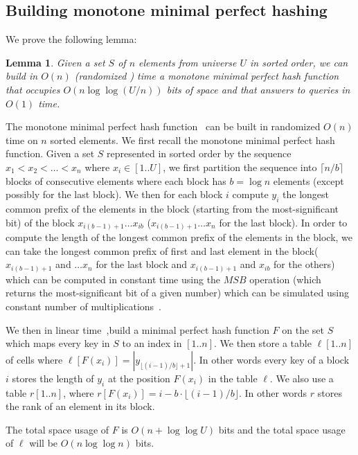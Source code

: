 \documentclass[a4paper]{article}
\newtheorem{lemma}{Lemma}
\begin{document}
\subsection{Building monotone minimal perfect hashing}
\label{sec:build_mmphf}
We prove the following lemma:


\begin{lemma}
\label{lemma:build_mmphf}
Given a set $S$ of $n$ elements from universe $U$ in sorted order, we can build in $O(n)$
(randomized ) time a monotone minimal perfect hash function that occupies $O(n\log\log(U/n))$
bits of space and that answers to queries in $O(1)$ time. 
\end{lemma}
The monotone minimal perfect hash function~\cite{BBPV09} can be built in randomized $O(n)$ time on $n$ sorted elements. 
We first recall the monotone minimal perfect hash function. Given a set $S$ represented in sorted 
order by the sequence $x_1<x_2<\ldots <x_n$
where $x_i\in [1..U]$, we first partition the sequence into $\lceil n/b\rceil$ blocks
of consecutive elements where each block has $b=\log n$ elements (except possibly for the last block). 
We then for each block $i$ compute $y_i$ the longest common prefix of the elements 
in the block (starting from the most-significant bit)
of the block $x_{i(b-1)+1}\ldots x_{ib}$ ($x_{i(b-1)+1}\ldots x_n$ for the last block). 
In order to compute the length of the longest common prefix of the elements in the block, 
we can take the longest common prefix of first and last element in the block(
$x_{i(b-1)+1}$ and $\ldots x_n$ for the last block and $x_{i(b-1)+1}$ and $x_{ib}$
for the others) which can be computed
in constant time using the $MSB$ operation (which returns the most-significant bit 
of a given number) which can be simulated using constant number of multiplications~\cite{brodnik1993computation}. 

We then in linear time~\cite{HT01},build a minimal perfect hash function $F$ on the set 
$S$ which maps every key in $S$ to an index 
in $[1..n]$. We then store a table $\ell[1..n]$ of cells where $\ell[F(x_i)]=|y_{\lfloor(i-1)/b\rfloor+1}|$. 
In other words every key of a block $i$ stores the length of $y_i$ at the position $F(x_i)$ in the table $\ell$.
We also use a table $r[1..n]$, where $r[F(x_i)]=i-b\cdot\lfloor(i-1)/b\rfloor$. In other words $r$ stores 
the rank of an element in its block.
 
The total space usage of $F$ is $O(n+\log\log U)$ bits and the total space usage of $\ell$ will be $O(n\log\log n)$ bits. 
\end{document}
